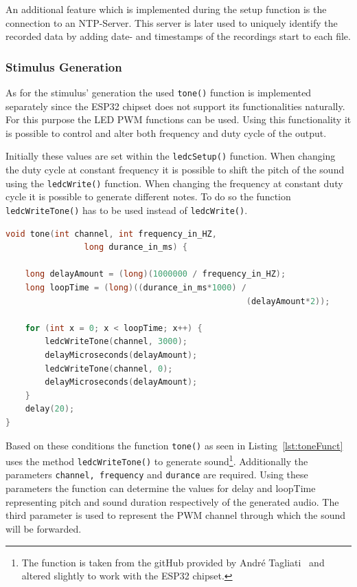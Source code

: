 An additional feature which is implemented during the setup function is the connection to an NTP-Server.
This server is later used to uniquely identify the recorded data by adding date- and timestamps of the recordings start to each file.

\subsubsection{Stimulus Generation}
As for the stimulus' generation the used \texttt{tone()} function is implemented separately since the ESP32 chipset does not support its functionalities naturally.
For this purpose the LED PWM functions can be used.
Using this functionality it is possible to control and alter both frequency and duty cycle of the output.

Initially these values are set within the \texttt{ledcSetup()} function.
When changing the duty cycle at constant frequency it is possible to shift the pitch of the sound using the \texttt{ledcWrite()} function.
When changing the frequency at constant duty cycle it is possible to generate different notes.
To do so the function \texttt{ledcWriteTone()} has to be used instead of \texttt{ledcWrite()}.
\begin{lstlisting}[frame=single, language={c++}, style=style,
				   caption={Function used to generate a single note using frequency and sound duration.}, label={lst:toneFunct},float=!htb]
void tone(int channel, int frequency_in_HZ,
		  		long durance_in_ms) {

	long delayAmount = (long)(1000000 / frequency_in_HZ);
	long loopTime = (long)((durance_in_ms*1000) / 
												 (delayAmount*2));

	for (int x = 0; x < loopTime; x++) {
		ledcWriteTone(channel, 3000);
		delayMicroseconds(delayAmount);
		ledcWriteTone(channel, 0);
		delayMicroseconds(delayAmount);
	}
	delay(20);
}
\end{lstlisting}

Based on these conditions the function \texttt{tone()} as seen in Listing~\ref{lst:toneFunct} uses the method \texttt{ledcWriteTone()} to generate sound\footnote{The function is taken from the gitHub provided by André Tagliati~\cite{tagliati} and altered slightly to work with the ESP32 chipset.}.
Additionally the parameters \texttt{channel, frequency} and \texttt{durance} are required.
Using these parameters the function can determine the values for delay and loopTime representing pitch and sound duration respectively of the generated audio.
The third parameter is used to represent the PWM channel through which the sound will be forwarded.


